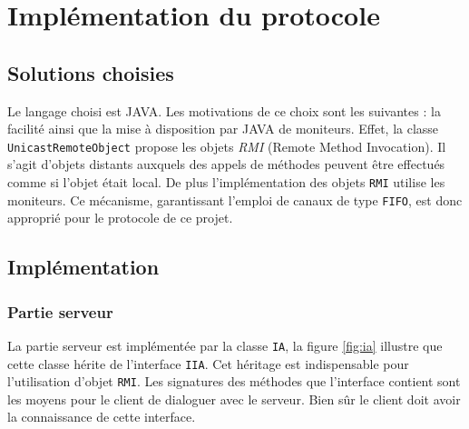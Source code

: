 \chapter{Implémentation du protocole}

\section{Solutions choisies}
Le langage choisi est \textsc{JAVA}. Les motivations de ce choix sont les suivantes : la facilité  ainsi que la mise à disposition par \textsc{JAVA} de moniteurs. Effet, la classe \texttt{UnicastRemoteObject} propose les objets \textit{RMI} (Remote Method Invocation). Il s'agit d'objets \og distants \fg{} auxquels des appels de méthodes peuvent être effectués comme si l'objet était local. De plus  l'implémentation des objets \texttt{RMI}  utilise les moniteurs. Ce mécanisme, garantissant l'emploi de canaux de type \texttt{FIFO}, est donc approprié pour le protocole de ce projet.  

\section{Implémentation}

\subsection{Partie serveur}
La partie \og serveur \fg{} est implémentée par la classe \texttt{IA}, la figure \ref{fig:ia} illustre que cette classe hérite de l'interface \texttt{IIA}. Cet héritage est indispensable pour l'utilisation d'objet \texttt{RMI}. Les signatures des méthodes que l'interface contient sont les moyens pour le client de dialoguer avec le serveur. Bien sûr le client doit avoir la connaissance de cette interface.

